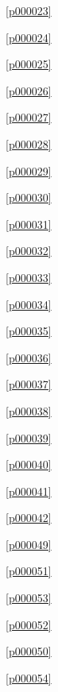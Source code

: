 \noindent\figurename\ \ref{p000023}\dotfill\pageref{p000023}

\noindent\figurename\ \ref{p000024}\dotfill\pageref{p000024}

\noindent\figurename\ \ref{p000025}\dotfill\pageref{p000025}

\noindent\figurename\ \ref{p000026}\dotfill\pageref{p000026}

\noindent\figurename\ \ref{p000027}\dotfill\pageref{p000027}

\noindent\figurename\ \ref{p000028}\dotfill\pageref{p000028}

\noindent\figurename\ \ref{p000029}\dotfill\pageref{p000029}

\noindent\figurename\ \ref{p000030}\dotfill\pageref{p000030}

\noindent\figurename\ \ref{p000031}\dotfill\pageref{p000031}

\noindent\figurename\ \ref{p000032}\dotfill\pageref{p000032}

\noindent\figurename\ \ref{p000033}\dotfill\pageref{p000033}

\noindent\figurename\ \ref{p000034}\dotfill\pageref{p000034}

\noindent\figurename\ \ref{p000035}\dotfill\pageref{p000035}

\noindent\figurename\ \ref{p000036}\dotfill\pageref{p000036}

\noindent\figurename\ \ref{p000037}\dotfill\pageref{p000037}

\noindent\figurename\ \ref{p000038}\dotfill\pageref{p000038}

\noindent\figurename\ \ref{p000039}\dotfill\pageref{p000039}

\noindent\figurename\ \ref{p000040}\dotfill\pageref{p000040}

\noindent\figurename\ \ref{p000041}\dotfill\pageref{p000041}

\noindent\figurename\ \ref{p000042}\dotfill\pageref{p000042}

\noindent\figurename\ \ref{p000049}\dotfill\pageref{p000049}

\noindent\figurename\ \ref{p000051}\dotfill\pageref{p000051}

\noindent\figurename\ \ref{p000053}\dotfill\pageref{p000053}

\noindent\figurename\ \ref{p000052}\dotfill\pageref{p000052}

\noindent\figurename\ \ref{p000050}\dotfill\pageref{p000050}

\noindent\figurename\ \ref{p000054}\dotfill\pageref{p000054}

